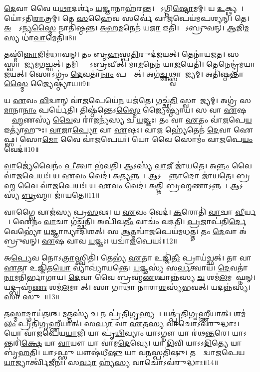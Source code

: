 \ul{𑌦𑍇}𑌵𑌾 𑌵𑍈 𑌯\ul{𑌥𑌾}𑌦𑌰𑍍\mbox{}𑌶𑌂॑ \ul{𑌯}𑌜𑍍𑌞𑌾𑌨𑌾𑌹॑𑌰𑌨𑍍𑌤।
𑌯𑍋᳚𑌽𑌗𑍍𑌨𑌿\ul{𑌷𑍍𑌟𑍋}𑌮𑌮𑍍।
𑌯 \ul{𑌉}𑌕𑍍𑌥𑍍𑌯𑌮𑍍᳚।
𑌯𑍋॑𑌽𑌤𑌿\ul{𑌰𑌾}𑌤𑍍𑌰𑌮𑍍।
𑌤𑍇 \ul{𑌸}𑌹𑍈𑌵 𑌸𑌰𑍍𑌵𑍇॑ 𑌵𑌾\ul{𑌜}𑌪𑍇𑌯॑𑌮𑌪𑌶𑍍𑌯𑌨𑍍।
𑌤𑍇।
\ul{𑌅}𑌨𑍍𑌯𑍋᳚\-𑌽𑌨𑍍𑌯\ul{𑌸𑍍𑌮𑍈} 𑌨𑌾𑌤𑌿॑𑌷𑍍𑌠𑌨𑍍𑌤।
\ul{𑌅}𑌹\ul{𑌮}𑌨𑍇𑌨॑ 𑌯\ul{𑌜𑌾} 𑌇𑌤𑌿॑।
𑌤𑍇᳚𑌽𑌬𑍍𑌰𑍁𑌵𑌨𑍍।
\ul{𑌆}𑌜𑌿\ul{𑌮}𑌸𑍍𑌯 𑌧𑌾॑\ul{𑌵𑌾}𑌮𑍇𑌤𑌿॑॥8॥

𑌤𑌸𑍍𑌮𑌿॑\ul{𑌨𑍍𑌨𑌾}𑌜𑌿𑌮॑𑌧𑌾𑌵𑌨𑍍।
𑌤𑌂 𑌬𑍃\ul{𑌹}𑌸𑍍𑌪\ul{𑌤𑌿}𑌰𑍁𑌦॑𑌜𑌯𑌤𑍍।
𑌤𑍇𑌨𑌾॑𑌯𑌜𑌤।
𑌸 𑌸𑍍𑌵𑌾𑌰𑌾᳚𑌜𑍍𑌯𑌮𑌗𑌚𑍍𑌛𑌤𑍍।
𑌤𑌮𑌿𑌨𑍍𑌦𑍍𑌰𑍋᳚\-𑌽𑌬𑍍𑌰𑌵𑍀𑌤𑍍।
𑌮𑌾\ul{𑌮}𑌨𑍇𑌨॑ 𑌯𑌾\ul{𑌜}𑌯𑍇𑌤𑌿॑।
𑌤𑍇𑌨𑍇𑌨𑍍𑌦𑍍𑌰॑𑌮𑌯𑌾𑌜𑌯𑌤𑍍।
𑌸𑍋𑌽𑌗𑍍𑌰𑌂॑ \ul{𑌦𑍇}𑌵𑌤𑌾॑\ul{𑌨𑌾𑌂} 𑌪𑌰𑍍𑌯𑍈᳚𑌤𑍍।
𑌅𑌗॑\ul{𑌚𑍍𑌛}𑌥𑍍𑌸𑍍𑌵𑌾𑌰𑌾᳚𑌜𑍍𑌯𑌮𑍍।
𑌅𑌤𑌿॑𑌷𑍍𑌠𑌨𑍍𑌤𑌾\ul{𑌸𑍍𑌮𑍈} 𑌜𑍍𑌯𑍈𑌷𑍍𑌠𑍍𑌯𑌾॑𑌯॥9॥

𑌯 \ul{𑌏}𑌵𑌂 \ul{𑌵𑌿}𑌦𑍍𑌵𑌾𑌨𑍍 𑌵𑌾॑\ul{𑌜}𑌪𑍇𑌯𑍇॑\ul{𑌨} 𑌯𑌜॑𑌤𑍇।
𑌗𑌚𑍍𑌛॑\ul{𑌤𑌿} 𑌸𑍍𑌵𑌾𑌰𑌾᳚𑌜𑍍𑌯𑌮𑍍।
𑌅𑌗𑍍𑌰॑ 𑌸\ul{𑌮𑌾}𑌨𑌾\ul{𑌨𑌾𑌂} 𑌪𑌰𑍍𑌯𑍇॑𑌤𑌿।
𑌤𑌿𑌷𑍍𑌠॑𑌨𑍍𑌤𑍇\-𑌽\ul{𑌸𑍍𑌮𑍈} 𑌜𑍍𑌯𑍈𑌷𑍍𑌠𑍍𑌯𑌾॑𑌯।
𑌸 𑌵𑌾 \ul{𑌏}𑌷 𑌬𑍍𑌰𑌾᳚\ul{𑌹𑍍𑌮}𑌣𑌸𑍍𑌯॑ \ul{𑌚𑍈}𑌵 𑌰𑌾॑\ul{𑌜}𑌨𑍍𑌯॑𑌸𑍍𑌯 𑌚 \ul{𑌯}𑌜𑍍𑌞𑌃।
𑌤𑌂 𑌵𑌾 \ul{𑌏}𑌤𑌂 𑌵𑌾॑\ul{𑌜}𑌪𑍇\ul{𑌯} 𑌇𑌤𑍍𑌯𑌾॑𑌹𑍁𑌃।
\ul{𑌵𑌾}𑌜𑌾\ul{𑌪𑍍𑌯𑍋} 𑌵𑌾 \ul{𑌏}𑌷𑌃।
𑌵𑌾\ul{𑌜}\ul{} 𑌹𑍍𑌯𑍇॑𑌤𑍇𑌨॑ \ul{𑌦𑍇}𑌵𑌾 𑌐𑌫𑍍𑌸\sn{}।
𑌸𑍋\ul{𑌮𑍋} 𑌵𑍈 𑌵𑌾॑\ul{𑌜}𑌪𑍇𑌯𑌃॑।
𑌯𑍋 𑌵𑍈 𑌸𑍋𑌮𑌂॑ 𑌵𑌾\ul{𑌜}𑌪𑍇\ul{𑌯𑌂} 𑌵𑍇𑌦॑॥10॥

\ul{𑌵𑌾}𑌜𑍍𑌯𑍇॑𑌵𑍈𑌨𑌂॑ \ul{𑌪𑍀}𑌤𑍍𑌵𑌾 𑌭॑𑌵𑌤𑌿।
𑌆𑌽𑌸𑍍𑌯॑ \ul{𑌵𑌾}𑌜𑍀 𑌜𑌾॑𑌯𑌤𑍇।
𑌅\ul{𑌨𑍍𑌨𑌂} 𑌵𑍈 𑌵𑌾॑\ul{𑌜}𑌪𑍇𑌯𑌃॑।
𑌯 \ul{𑌏}𑌵𑌂 𑌵𑍇𑌦॑।
𑌅𑌤𑍍𑌯𑌨𑍍𑌨𑌮𑍍᳚।
𑌆𑌽𑌸𑍍𑌯𑌾᳚\ul{𑌨𑍍𑌨𑌾}𑌦𑍋 𑌜𑌾॑𑌯𑌤𑍇।
𑌬𑍍𑌰\ul{𑌹𑍍𑌮} 𑌵𑍈 𑌵𑌾॑\ul{𑌜}𑌪𑍇𑌯𑌃॑।
𑌯 \ul{𑌏}𑌵𑌂 𑌵𑍇𑌦॑।
𑌅\ul{𑌤𑍍𑌤𑌿} 𑌬𑍍𑌰\ul{𑌹𑍍𑌮}𑌣𑌾\-𑌽𑌨𑍍𑌨𑌮𑍍᳚।
𑌆𑌽𑌸𑍍𑌯॑ \ul{𑌬𑍍𑌰}𑌹𑍍𑌮𑌾 𑌜𑌾॑𑌯𑌤𑍇॥11॥

𑌵𑌾𑌗𑍍𑌵𑍈 𑌵𑌾𑌜॑𑌸𑍍𑌯 𑌪𑍍𑌰\ul{𑌸}𑌵𑌃।
𑌯 \ul{𑌏}𑌵𑌂 𑌵𑍇𑌦॑।
\ul{𑌕}𑌰𑍋𑌤𑌿॑ \ul{𑌵𑌾}𑌚𑌾 \ul{𑌵𑍀}𑌰𑍍𑌯𑌮𑍍᳚।
𑌐𑌨𑌂॑ \ul{𑌵𑌾}𑌚𑌾 𑌗॑𑌚𑍍𑌛𑌤𑌿।
𑌅𑌪𑌿॑𑌵\ul{𑌤𑍀𑌂} 𑌵𑌾𑌚𑌂॑ 𑌵𑌦𑌤𑌿।
\ul{𑌪𑍍𑌰}𑌜𑌾𑌪॑𑌤𑌿\ul{𑌰𑍍𑌦𑍇}𑌵𑍇𑌭𑍍𑌯𑍋॑ \ul{𑌯}𑌜𑍍𑌞𑌾𑌨𑍍𑌵𑍍𑌯𑌾𑌦𑌿॑𑌶𑌤𑍍।
𑌸 \ul{𑌆}𑌤𑍍𑌮𑌨𑍍𑌵𑌾॑\ul{𑌜}𑌪𑍇𑌯॑𑌮𑌧𑌤𑍍𑌤।
𑌤𑌂 \ul{𑌦𑍇}𑌵𑌾 𑌅॑𑌬𑍍𑌰𑍁𑌵𑌨𑍍।
\ul{𑌏}𑌷 𑌵𑌾𑌵 \ul{𑌯}𑌜𑍍𑌞𑌃।
𑌯𑌦𑍍𑌵𑌾॑\ul{𑌜}𑌪𑍇𑌯𑌃॑॥12॥

𑌅\ul{𑌪𑍍𑌯𑍇}𑌵 𑌨𑍋𑌽\ul{𑌤𑍍𑌰𑌾}𑌸𑍍𑌤𑍍𑌵𑌿𑌤𑌿॑।
𑌤𑍇𑌭𑍍𑌯॑ \ul{𑌏}𑌤𑌾 𑌉𑌜𑍍𑌜𑌿॑\ul{𑌤𑍀𑌃} 𑌪𑍍𑌰𑌾𑌯॑𑌚𑍍𑌛𑌤𑍍।
𑌤𑌾 𑌵𑌾 \ul{𑌏}𑌤𑌾 𑌉𑌜𑍍𑌜𑌿॑𑌤\ul{𑌯𑍋} 𑌵𑍍𑌯𑌾𑌖𑍍𑌯𑌾॑𑌯𑌨𑍍𑌤𑍇।
\ul{𑌯}𑌜𑍍𑌞𑌸𑍍𑌯॑ 𑌸\ul{𑌰𑍍𑌵}𑌤𑍍𑌵𑌾𑌯॑।
\ul{𑌦𑍇}𑌵𑌤𑌾॑\ul{𑌨𑌾}𑌮𑌨𑌿॑𑌰𑍍𑌭𑌾𑌗𑌾𑌯।
\ul{𑌦𑍇}𑌵𑌾 𑌵𑍈 𑌬𑍍𑌰𑌹𑍍𑌮॑\ul{𑌣}𑌶𑍍𑌚𑌾𑌨𑍍𑌨॑𑌸𑍍𑌯 \ul{𑌚} 𑌶𑌮॑\ul{𑌲}𑌮𑌪𑌾᳚𑌘𑍍𑌨𑌨𑍍।
𑌯𑌦𑍍𑌬𑍍𑌰𑌹𑍍𑌮॑\ul{𑌣𑌃} 𑌶𑌮॑\ul{𑌲}𑌮𑌾𑌸𑍀᳚𑌤𑍍।
𑌸𑌾 𑌗𑌾𑌥𑌾॑ 𑌨𑌾𑌰𑌾\ul{𑌶}\ul{}𑌸𑍍𑌯॑𑌭𑌵𑌤𑍍।
𑌯𑌦𑌨𑍍𑌨॑𑌸𑍍𑌯।
𑌸𑌾 𑌸𑍁𑌰𑌾᳚॥13॥

𑌤\ul{𑌸𑍍𑌮𑌾}𑌦𑍍𑌗𑌾𑌯॑𑌤𑌶𑍍𑌚 \ul{𑌮}𑌤𑍍𑌤𑌸𑍍𑌯॑ \ul{𑌚} 𑌨 𑌪𑍍𑌰॑\ul{𑌤𑌿}𑌗𑍃𑌹𑍍𑌯𑌮𑍍᳚।
𑌯𑌤𑍍𑌪𑍍𑌰॑𑌤𑌿𑌗𑍃\ul{𑌹𑍍𑌣𑍀}𑌯𑌾𑌤𑍍।
𑌶𑌮॑\ul{𑌲𑌂} 𑌪𑍍𑌰𑌤𑌿॑\-𑌗𑍃𑌹𑍍𑌣𑍀𑌯𑌾𑌤𑍍।
𑌸\ul{𑌰𑍍𑌵𑌾} 𑌵𑌾 \ul{𑌏}𑌤\ul{𑌸𑍍𑌯} 𑌵𑌾𑌚𑍋\-𑌽𑌵॑𑌰𑍁𑌦𑍍𑌧𑌾𑌃।
𑌯𑍋 𑌵𑌾॑𑌜𑌪𑍇𑌯\ul{𑌯𑌾}𑌜𑍀।
𑌯𑌾 𑌪𑍃॑\ul{𑌥𑌿}𑌵𑍍𑌯𑌾𑌂 𑌯𑌾𑌽𑌗𑍍𑌨𑍗 𑌯𑌾 𑌰॑𑌥\ul{𑌨𑍍𑌤}𑌰𑍇।
𑌯𑌾𑌽𑌨𑍍𑌤𑌰𑌿॑\ul{𑌕𑍍𑌷𑍇} 𑌯𑌾 \ul{𑌵𑌾}𑌯𑍗 𑌯𑌾 𑌵𑌾॑𑌮\ul{𑌦𑍇}𑌵𑍍𑌯𑍇।
𑌯𑌾 \ul{𑌦𑌿}𑌵𑌿 𑌯𑌾𑌽𑌽\ul{𑌦𑌿}𑌤𑍍𑌯𑍇 𑌯𑌾 𑌬𑍃॑\ul{𑌹}𑌤𑌿।
𑌯𑌾𑌽𑌫𑍍𑌸𑍁 𑌯𑍗𑌷॑𑌧𑍀\ul{𑌷𑍁} 𑌯𑌾 𑌵\ul{𑌨}𑌸𑍍𑌪𑌤𑌿॑𑌷𑍁।
𑌤𑌸𑍍𑌮𑌾᳚𑌦𑍍𑌵𑌾𑌜𑌪𑍇𑌯\ul{𑌯𑌾}𑌜𑍍𑌯𑌾𑌰𑍍𑌤𑍍𑌵𑌿॑𑌜𑍀𑌨𑌃।
𑌸\ul{𑌰𑍍𑌵𑌾} 𑌹𑍍𑌯॑\ul{𑌸𑍍𑌯} 𑌵𑌾𑌚𑍋\-𑌽𑌵॑𑌰𑍁𑌦𑍍𑌧𑌾𑌃॥14॥\anuvakamend[\ul{𑌧𑌾}\ul{𑌵𑌾}𑌮𑍇\ul{𑌤𑌿} 𑌜𑍍𑌯𑍈𑌷𑍍𑌠𑍍𑌯𑌾॑\ul{𑌯} 𑌵𑍇𑌦॑ \ul{𑌬𑍍𑌰}𑌹𑍍𑌮𑌾 𑌜𑌾॑𑌯𑌤𑍇 𑌵𑌾\ul{𑌜}𑌪𑍇\ul{𑌯𑌃} 𑌸𑍁𑌰𑌾\-𑌽𑌽𑌰𑍍𑌤𑍍𑌵𑌿॑𑌜𑍀\ul{𑌨} 𑌏𑌕𑌂॑ 𑌚]

